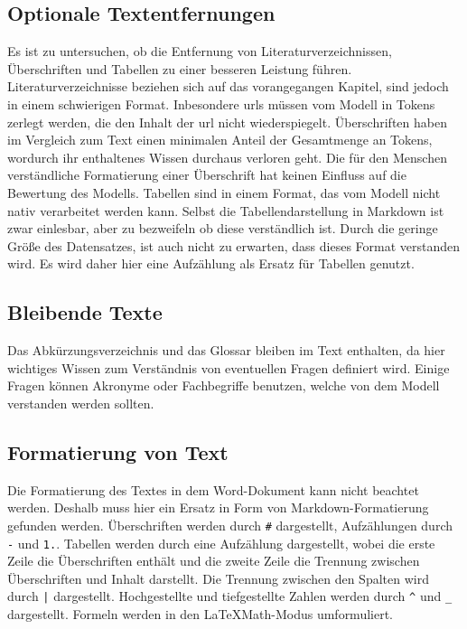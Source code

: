 \subsection{Optionale Textentfernungen}
Es ist zu untersuchen, ob die Entfernung von Literaturverzeichnissen, Überschriften und Tabellen zu einer besseren Leistung führen.
Literaturverzeichnisse beziehen sich auf das vorangegangen Kapitel, sind jedoch in einem schwierigen Format.
Inbesondere \ac{url}s müssen vom Modell in Tokens zerlegt werden, die den Inhalt der \ac{url} nicht wiederspiegelt. 
Überschriften haben im Vergleich zum Text einen minimalen Anteil der Gesamtmenge an Tokens, wordurch ihr enthaltenes Wissen durchaus verloren geht.
Die für den Menschen verständliche Formatierung einer Überschrift hat keinen Einfluss auf die Bewertung des Modells.
Tabellen sind in einem Format, das vom Modell nicht nativ verarbeitet werden kann.
Selbst die Tabellendarstellung in Markdown ist zwar einlesbar, aber zu bezweifeln ob diese verständlich ist.
Durch die geringe Größe des Datensatzes, ist auch nicht zu erwarten, dass dieses Format verstanden wird.
Es wird daher hier eine Aufzählung als Ersatz für Tabellen genutzt.

\subsection{Bleibende Texte}
Das Abkürzungsverzeichnis und das Glossar bleiben im Text enthalten, da hier wichtiges Wissen zum Verständnis von eventuellen Fragen definiert wird.
Einige Fragen können Akronyme oder Fachbegriffe benutzen, welche von dem Modell verstanden werden sollten.

\subsection{Formatierung von Text}
Die Formatierung des Textes in dem Word-Dokument kann nicht beachtet werden.
Deshalb muss hier ein Ersatz in Form von Markdown-Formatierung gefunden werden.
Überschriften werden durch \texttt{\#} dargestellt, Aufzählungen durch \texttt{-} und \texttt{1.}.
Tabellen werden durch eine Aufzählung dargestellt, wobei die erste Zeile die Überschriften enthält und die zweite Zeile die Trennung zwischen Überschriften und Inhalt darstellt.
Die Trennung zwischen den Spalten wird durch \texttt{|} dargestellt.
Hochgestellte und tiefgestellte Zahlen werden durch \texttt{\^} und \texttt{\_} dargestellt.
Formeln werden in den \LaTeX Math-Modus umformuliert.

